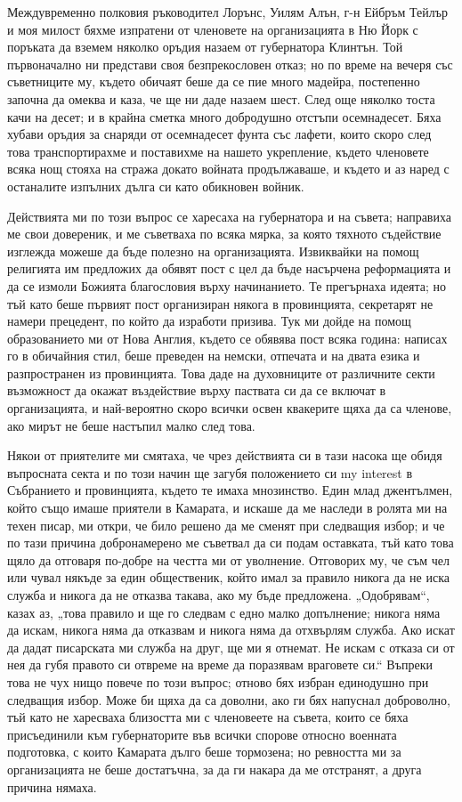 \documentclass[12pt]{book}
\begin{document}
Междувременно полковия ръководител Лорънс, Уилям Алън, г-н Ейбръм Тейлър и моя милост бяхме изпратени от членовете на организацията в Ню Йорк с поръката да вземем няколко оръдия назаем от губернатора Клинтън. Той първоначално ни представи своя безпрекословен отказ; но по време на вечеря със съветниците му, където обичаят беше да се пие много мадейра, постепенно започна да омеква и каза, че ще ни даде назаем шест. След още няколко тоста качи на десет; и в крайна сметка много добродушно отстъпи осемнадесет. Бяха хубави оръдия за снаряди от осемнадесет фунта със лафети, които скоро след това транспортирахме и поставихме на нашето укрепление, където членовете всяка нощ стояха на стража докато войната продължаваше, и където и аз наред с останалите изпълних дълга си като обикновен войник.  

Действията ми по този въпрос се харесаха на губернатора и на съвета; направиха ме свои довереник, и ме съветваха по всяка мярка, за която тяхното съдействие изглежда можеше да бъде полезно на организацията. Извиквайки на помощ религията им предложих да обявят пост с цел да бъде насърчена реформацията и да се измоли Божията благословия върху начинанието.  Те прегърнаха идеята; но тъй като беше първият пост организиран някога в провинцията, секретарят не намери прецедент, по който да изработи призива. Тук ми дойде на помощ образованието ми от Нова Англия, където се обявява пост всяка година: написах го в обичайния стил, беше преведен на немски, отпечата и на двата езика и разпространен из провинцията. Това даде на духовниците от различните секти възможност да окажат въздействие върху паствата си да се включат в организацията, и най-вероятно скоро всички освен квакерите щяха да са членове, ако мирът не беше настъпил малко след това.

Някои от приятелите ми смятаха, че чрез действията си в тази насока ще обидя въпросната секта и по този начин ще загубя положението си my interest в Събранието и провинцията, където те имаха мнозинство. Един млад джентълмен, който също имаше приятели в Камарата, и искаше да ме наследи в ролята ми на техен писар, ми откри, че било решено да ме сменят при следващия избор; и че по тази причина добронамерено ме съветвал да си подам оставката, тъй като това щяло да отговаря по-добре на честта ми от уволнение. Отговорих му, че съм чел или чувал някъде за един общественик, който имал за правило никога да не иска служба и никога да не отказва такава, ако му бъде предложена. „Одобрявам“, казах аз, „това правило и ще го следвам с едно малко допълнение; никога няма да искам, никога няма да отказвам и никога няма да отхвърлям служба. Ако искат да дадат писарската ми служба на друг, ще ми я отнемат. Не искам с отказа си от нея да губя правото си отвреме на време да поразявам враговете си.“ Въпреки това не чух нищо повече по този въпрос; отново бях избран единодушно при следващия избор. Може би щяха да са доволни, ако ги бях напуснал доброволно, тъй като не харесваха близостта ми с членовеете на съвета, които се бяха присъединили към губернаторите във всички спорове относно военната подготовка, с които Камарата дълго беше тормозена; но ревността ми за организацията не беше достатъчна, за да ги накара да ме отстранят, а друга причина нямаха.
\end{document}

